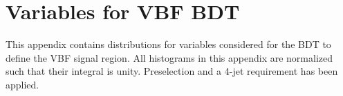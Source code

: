 \section{Variables for VBF BDT} \label{app:vbf-variables}


This appendix contains distributions for variables considered for the BDT to define the VBF signal region. All histograms in this appendix are normalized such that their integral is unity. Preselection and a 4-jet requirement has been applied.

\begin{figure}[htbp]
    \centering



\end{figure}

